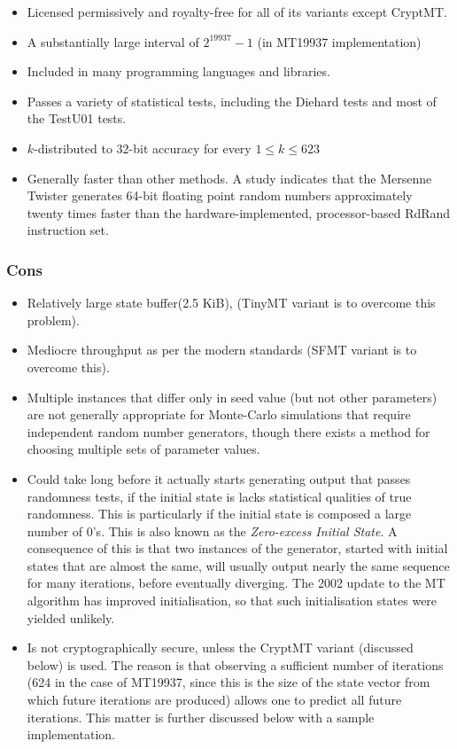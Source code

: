 \begin{itemize}
    \item Licensed permissively and royalty-free for all of its variants except CryptMT.
    \item A substantially large interval of $2^{19937} − 1$ (in MT19937 implementation)
    \item Included in many programming languages and libraries.
    \item Passes a variety of statistical tests, including the Diehard tests and most of the TestU01 tests.
    \item $k$-distributed to 32-bit accuracy for every $1 \leq k \leq 623$
    \item Generally faster than other methods. A study indicates that the Mersenne Twister generates 64-bit floating point random numbers approximately twenty times faster than the hardware-implemented, processor-based RdRand instruction set.\cite{art_route_astrophysical_jrn}
\end{itemize}

\subsubsection{Cons}

\begin{itemize}
    \item Relatively large state buffer(2.5 KiB), (TinyMT variant is to overcome this problem).
	\item Mediocre throughput as per the modern standards (SFMT variant is to overcome this).
	\item Multiple instances that differ only in seed value (but not other parameters) are not generally appropriate for Monte-Carlo simulations that require independent random number generators, though there exists a method for choosing multiple sets of parameter values.
	\item Could take long before it actually starts generating output that passes randomness tests, if the initial state is lacks statistical qualities of true randomness. This is particularly if the initial state is composed a large number of 0's. This is also known as the \textit{Zero-excess Initial State}. A consequence of this is that two instances of the generator, started with initial states that are almost the same, will usually output nearly the same sequence for many iterations, before eventually diverging. The 2002 update to the MT algorithm has improved initialisation, so that such initialisation states were yielded unlikely.
	\item Is not cryptographically secure, unless the CryptMT variant (discussed below) is used. The reason is that observing a sufficient number of iterations (624 in the case of MT19937, since this is the size of the state vector from which future iterations are produced) allows one to predict all future iterations. This matter is further discussed below with a sample implementation.
\end{itemize}

